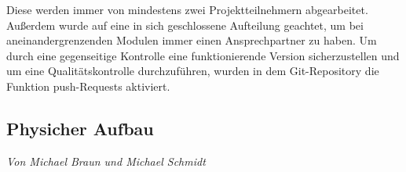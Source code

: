 \documentclass[12pt,a4paper,bibliography=totoc,listof=totoc]{scrartcl}
\begin{document}
Diese werden immer von mindestens zwei Projektteilnehmern abgearbeitet. Außerdem wurde auf eine in sich 
geschlossene Aufteilung geachtet, um bei aneinandergrenzenden Modulen immer einen Ansprechpartner zu haben. 
Um durch eine gegenseitige Kontrolle eine funktionierende Version sicherzustellen und um eine 
Qualitätskontrolle durchzuführen, wurden in dem Git-Repository die Funktion push-Requests aktiviert.
\pagebreak
\subsection{Physicher Aufbau}
\textit{Von Michael Braun und Michael Schmidt}\newline
\end{document}
